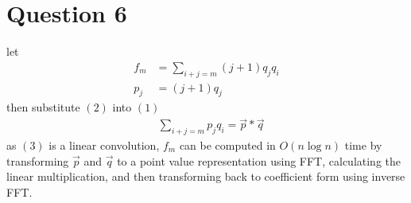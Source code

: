 \documentclass{article}
\begin{document}
\section*{Question 6}
let
\begin{align}
    f_m &= \sum_{i+j=m} (j+1)q_jq_i \\
    p_j &= (j+1)q_j
\end{align}
then substitute $(2)$ into $(1)$
\begin{align}
    & \sum_{i+j=m} p_jq_i = \vec{p} \ast \vec{q}
\end{align}
as $(3)$ is a linear convolution, $f_m$ can be computed in $O(n\log n )$ time by transforming $\vec{p}$ and $\vec{q}$ to a point value representation using FFT, calculating the linear multiplication, and then transforming back to coefficient form using inverse FFT.

\pagebreak
\end{document}
